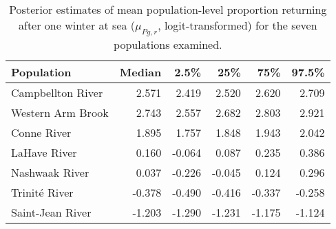 \begin{table}[ht]
\centering
\caption{Posterior estimates of mean population-level
                     proportion returning after one winter at sea 
                    ($\mu_{Pg,r}$, logit-transformed) for the seven populations examined.} 
\label{tab:prmu}
\begin{tabular}{lrrrrr}
  \hline
Population & Median & 2.5\% & 25\% & 75\% & 97.5\% \\ 
  \hline
Campbellton River & 2.571 & 2.419 & 2.520 & 2.620 & 2.709 \\ 
  Western Arm Brook & 2.743 & 2.557 & 2.682 & 2.803 & 2.921 \\ 
  Conne River & 1.895 & 1.757 & 1.848 & 1.943 & 2.042 \\ 
  LaHave River & 0.160 & -0.064 & 0.087 & 0.235 & 0.386 \\ 
  Nashwaak River & 0.037 & -0.226 & -0.045 & 0.124 & 0.296 \\ 
  Trinité River & -0.378 & -0.490 & -0.416 & -0.337 & -0.258 \\ 
  Saint-Jean River & -1.203 & -1.290 & -1.231 & -1.175 & -1.124 \\ 
   \hline
\end{tabular}
\end{table}

